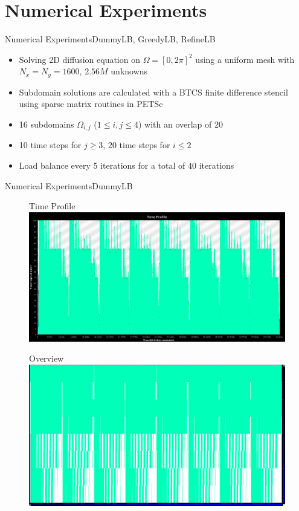 \documentclass[]{beamer}
\begin{document}
\section{Numerical Experiments}

\begin{frame}{Numerical Experiments}{DummyLB, GreedyLB, RefineLB}
  
  \begin{itemize}
  \item Solving 2D diffusion equation on $\Omega = [0,2\pi]^2$ using a
    uniform mesh with $N_x = N_y = 1600$, $2.56M$ unknowns
  \item Subdomain solutions are calculated with a BTCS finite
    difference stencil using sparse matrix routines in PETSc
  \item 16 subdomains $\Omega_{i,j}$ ($1\leq i,j \leq 4$) with an
    overlap of 20
  \item 10 time steps for $j\geq3$, 20 time steps for $i\leq2$
  \item Load balance every 5 iterations for a total of 40 iterations
  \end{itemize}
\end{frame}

\begin{frame}{Numerical Experiments}{DummyLB}
  \begin{figure}{Time Profile}
    \includegraphics[width=.65\paperwidth,height=.35\paperheight]{figures/LoadBalancing/TimeProfileDummyLB}
  \end{figure}
  \begin{figure}{\hspace{15pt}Overview}
    \includegraphics[width=.65\paperwidth,height=.35\paperheight]{figures/LoadBalancing/OverviewDummyLB}
  \end{figure}
\end{frame}
\end{document}
